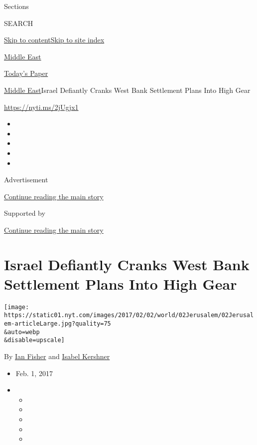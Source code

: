 Sections

SEARCH

\protect\hyperlink{site-content}{Skip to
content}\protect\hyperlink{site-index}{Skip to site index}

\href{https://www.nytimes.com/section/world/middleeast}{Middle East}

\href{https://myaccount.nytimes.com/auth/login?response_type=cookie\&client_id=vi}{}

\href{https://www.nytimes.com/section/todayspaper}{Today's Paper}

\href{/section/world/middleeast}{Middle East}\textbar{}Israel Defiantly
Cranks West Bank Settlement Plans Into High Gear

\url{https://nyti.ms/2jUgjx1}

\begin{itemize}
\item
\item
\item
\item
\item
\end{itemize}

Advertisement

\protect\hyperlink{after-top}{Continue reading the main story}

Supported by

\protect\hyperlink{after-sponsor}{Continue reading the main story}

\hypertarget{israel-defiantly-cranks-west-bank-settlement-plans-into-high-gear}{%
\section{Israel Defiantly Cranks West Bank Settlement Plans Into High
Gear}\label{israel-defiantly-cranks-west-bank-settlement-plans-into-high-gear}}

\texttt{[image: https://static01.nyt.com/images/2017/02/02/world/02Jerusalem/02Jerusalem-articleLarge.jpg?quality=75\\\&auto=webp\\\&disable=upscale]}

By \href{http://www.nytimes.com/by/ian-fisher}{Ian Fisher} and
\href{https://www.nytimes.com/by/isabel-kershner}{Isabel Kershner}

\begin{itemize}
\item
  Feb. 1, 2017
\item
  \begin{itemize}
  \item
  \item
  \item
  \item
  \item
  \end{itemize}
\end{itemize}

